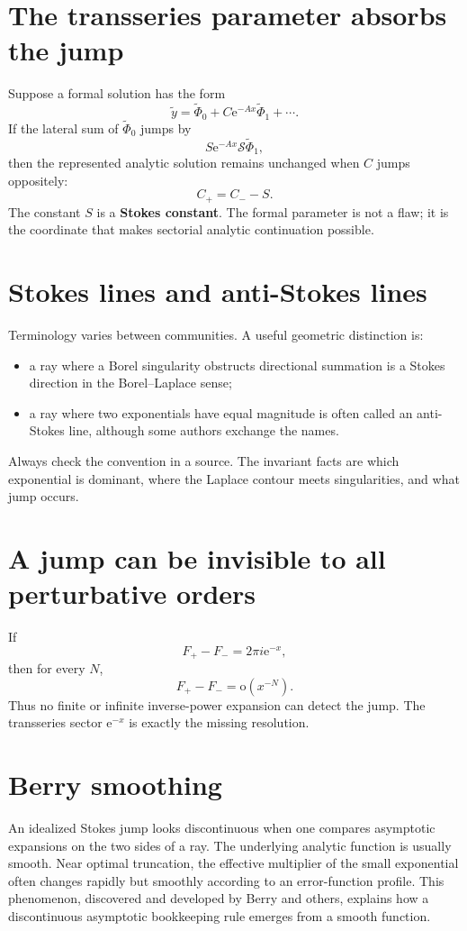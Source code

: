 \documentclass[11pt,openany]{book}
\theoremstyle{plain}
\theoremstyle{definition}
\theoremstyle{remark}
\newcommand{\smallo}{\mathrm{o}}
\newcommand{\e}{\mathrm{e}}
\newcommand{\defterm}[1]{\textbf{#1}}
\begin{document}
\section{The transseries parameter absorbs the jump}
Suppose a formal solution has the form
\[
  \widetilde y=\widetilde\Phi_0
  +C\e^{-Ax}\widetilde\Phi_1+\cdots.
\]
If the lateral sum of $\widetilde\Phi_0$ jumps by
\[
  S\e^{-Ax}\mathscr S\widetilde\Phi_1,
\]
then the represented analytic solution remains unchanged when $C$ jumps oppositely:
\[
  C_+=C_- -S.
\]
The constant $S$ is a \defterm{Stokes constant}. The formal parameter is not a flaw; it is the coordinate that makes sectorial analytic continuation possible.

\section{Stokes lines and anti-Stokes lines}
Terminology varies between communities. A useful geometric distinction is:
\begin{itemize}
\item a ray where a Borel singularity obstructs directional summation is a Stokes direction in the Borel--Laplace sense;
\item a ray where two exponentials have equal magnitude is often called an anti-Stokes line, although some authors exchange the names.
\end{itemize}
Always check the convention in a source. The invariant facts are which exponential is dominant, where the Laplace contour meets singularities, and what jump occurs.

\section{A jump can be invisible to all perturbative orders}
If
\[
  F_+-F_-=2\pi i\e^{-x},
\]
then for every $N$,
\[
  F_+-F_-=\smallo(x^{-N}).
\]
Thus no finite or infinite inverse-power expansion can detect the jump. The transseries sector $\e^{-x}$ is exactly the missing resolution.

\section{Berry smoothing}
An idealized Stokes jump looks discontinuous when one compares asymptotic expansions on the two sides of a ray. The underlying analytic function is usually smooth. Near optimal truncation, the effective multiplier of the small exponential often changes rapidly but smoothly according to an error-function profile. This phenomenon, discovered and developed by Berry and others, explains how a discontinuous asymptotic bookkeeping rule emerges from a smooth function.
\end{document}
